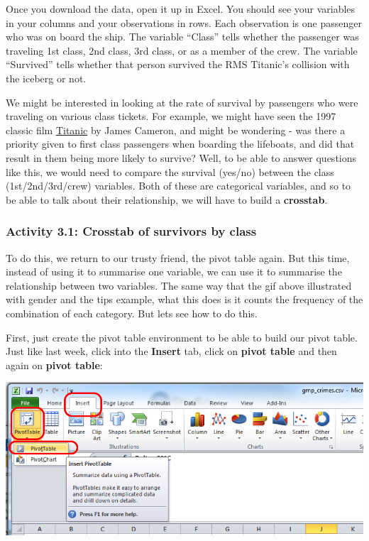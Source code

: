 \documentclass[
]{book}
\begin{document}
Once you download the data, open it up in Excel. You should see your variables in your columns and your observations in rows. Each observation is one passenger who was on board the ship. The variable ``Class'' tells whether the passenger was traveling 1st class, 2nd class, 3rd class, or as a member of the crew. The variable ``Survived'' tells whether that person survived the RMS Titanic's collision with the iceberg or not.

We might be interested in looking at the rate of survival by passengers who were traveling on various class tickets. For example, we might have seen the 1997 classic film \href{http://www.imdb.com/title/tt0120338/}{Titanic} by James Cameron, and might be wondering - was there a priority given to first class passengers when boarding the lifeboats, and did that result in them being more likely to survive? Well, to be able to answer questions like this, we would need to compare the survival (yes/no) between the class (1st/2nd/3rd/crew) variables. Both of these are categorical variables, and so to be able to talk about their relationship, we will have to build a \textbf{crosstab}.

\hypertarget{activity-3.1-crosstab-of-survivors-by-class}{%
\subsubsection{Activity 3.1: Crosstab of survivors by class}\label{activity-3.1-crosstab-of-survivors-by-class}}

To do this, we return to our trusty friend, the pivot table again. But this time, instead of using it to summarise one variable, we can use it to summarise the relationship between two variables. The same way that the gif above illustrated with gender and the tips example, what this does is it counts the frequency of the combination of each category. But lets see how to do this.

First, just create the pivot table environment to be able to build our pivot table. Just like last week, click into the \textbf{Insert} tab, click on \textbf{pivot table} and then again on \textbf{pivot table}:

\includegraphics{imgs/click_pivot.png}
\end{document}
